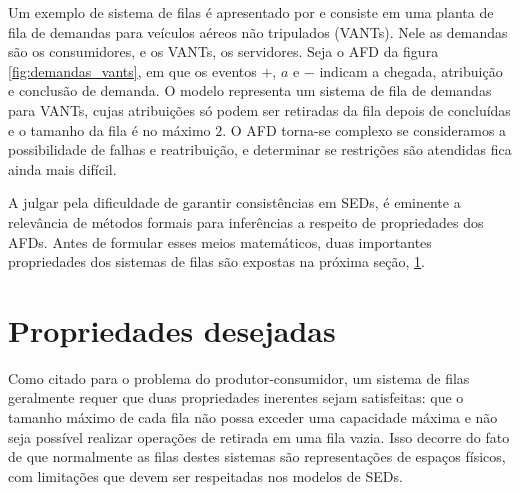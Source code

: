 Um exemplo de sistema de filas é apresentado por  e consiste em uma planta de fila de demandas para veículos aéreos não tripulados (\acs{VANT}s). Nele as demandas são os consumidores, e os VANTs, os servidores. Seja o AFD da figura \ref{fig:demandas_vants}, em que os eventos $+$, $a$ e $-$ indicam a chegada, atribuição e conclusão de demanda. O modelo representa um sistema de fila de demandas para VANTs, cujas atribuições só podem ser retiradas da fila depois de concluídas e o tamanho da fila é no máximo $2$. O AFD torna-se complexo se consideramos a possibilidade de falhas e reatribuição, e determinar se restrições são atendidas fica ainda mais difícil.


A julgar pela dificuldade de garantir consistências em SEDs, é eminente a relevância de métodos formais para inferências a respeito de propriedades dos AFDs. Antes de formular esses meios matemáticos, duas importantes propriedades dos sistemas de filas são expostas na próxima seção, \ref{sec:props}.

\section{Propriedades desejadas}
\label{sec:props}

Como citado para o problema do produtor-consumidor, um sistema de filas geralmente requer que duas propriedades inerentes sejam satisfeitas: que o tamanho máximo de cada fila não possa exceder uma capacidade máxima e não seja possível realizar operações de retirada em uma fila vazia. Isso decorre do fato de que normalmente as filas destes sistemas são representações de espaços físicos, com limitações que devem ser respeitadas nos modelos de SEDs.

